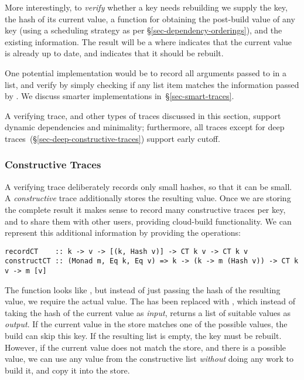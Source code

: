 More interestingly, to \emph{verify} whether a key needs rebuilding we supply
the key, the hash of its current value, a function for obtaining the post-build
value of any key (using a scheduling strategy as per
\S\ref{sec-dependency-orderings}), and the existing  information. The
result will be a  where  indicates that the current value is
already up to date, and  indicates that it should be rebuilt.

One potential implementation would be to record all arguments passed to
 in a list, and verify by simply checking if any list item matches
the information passed by .  We discuss smarter implementations
in~\S\ref{sec-smart-traces}.

A verifying trace, and other types of traces discussed in this section, support
dynamic dependencies and minimality; furthermore, all traces except for deep
traces~(\S\ref{sec-deep-constructive-traces}) support early cutoff.

\subsubsection{Constructive Traces}\label{sec-constructive-traces}

A verifying trace deliberately records only small hashes, so that it can be small.
A \emph{constructive} trace additionally stores the resulting value.
Once we are storing the complete result it makes sense
to record many constructive traces per key, and to share them with other users,
providing cloud-build functionality. We can represent this additional
information by providing the operations:

\begin{verbatim}
recordCT    :: k -> v -> [(k, Hash v)] -> CT k v -> CT k v
constructCT :: (Monad m, Eq k, Eq v) => k -> (k -> m (Hash v)) -> CT k v -> m [v]
\end{verbatim}

\noindent
The function  looks like , but instead of just passing
the hash of the resulting value, we require the actual value. The 
has been replaced with , which instead of taking the hash of the
current value as \emph{input}, returns a list of suitable values as \emph{output}.
If the current value in the store matches one of the possible values, the build
can skip this key. If the resulting list is empty, the key must be rebuilt.
However, if the current value does not match the store, and there is a possible
value, we can use any value from the constructive list \emph{without} doing any
work to build it, and copy it into the store.

